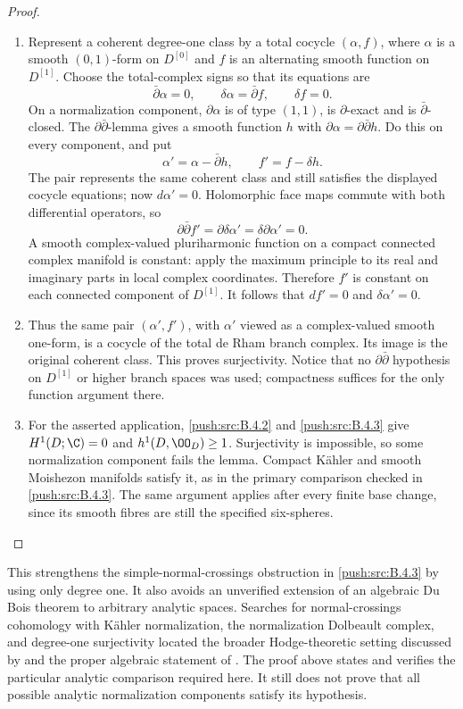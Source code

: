 \begin{proof}
\begin{enumerate}[label=\arabic*.,leftmargin=*]
\item Represent a coherent degree-one class by a total cocycle
$(\alpha,f)$, where $\alpha$ is a smooth $(0,1)$-form on
$D^{[0]}$ and $f$ is an alternating smooth function on
$D^{[1]}$. Choose the total-complex signs so that its equations
are
\[
 \bar\partial\alpha=0,\qquad
 \delta\alpha=\bar\partial f,\qquad \delta f=0.
\]
On a normalization component, $\partial\alpha$ is of type
$(1,1)$, is $\partial$-exact and is $\bar\partial$-closed.
The $\partial\bar\partial$-lemma gives a smooth function $h$
with $\partial\alpha=\partial\bar\partial h$.
Do this on every component, and put
\[
 \alpha'=\alpha-\bar\partial h,\qquad
 f'=f-\delta h.
\]
The pair represents the same coherent class and still satisfies
the displayed cocycle equations; now $d\alpha'=0$.
Holomorphic face maps commute with both differential operators,
so
\[
 \partial\bar\partial f'
       =\partial\delta\alpha'=\delta\partial\alpha'=0.
\]
A smooth complex-valued pluriharmonic function on a compact
connected complex manifold is constant: apply the maximum
principle to its real and imaginary parts in local complex
coordinates. Therefore $f'$ is constant on each connected
component of $D^{[1]}$. It follows that
$df'=0$ and $\delta\alpha'=0$.

\item Thus the same pair $(\alpha',f')$, with $\alpha'$ viewed as
a complex-valued smooth one-form, is a cocycle of the total
de Rham branch complex. Its image is the original coherent
class. This proves surjectivity. Notice that no
$\partial\bar\partial$ hypothesis on $D^{[1]}$ or higher
branch spaces was used; compactness suffices for the only
function argument there.

\item For the asserted application, \ref{push:src:B.4.2} and \ref{push:src:B.4.3} give
$H^1(D;\C)=0$ and $h^1(D,\OO_D)\geq1$.
Surjectivity is impossible, so some normalization component
fails the lemma. Compact K\"ahler and smooth Moishezon
manifolds satisfy it, as in the primary comparison checked
in \ref{push:src:B.4.3}. The same argument applies after every finite base
change, since its smooth fibres are still the specified
six-spheres.
\end{enumerate}
\end{proof}

This strengthens the simple-normal-crossings obstruction in
\ref{push:src:B.4.3} by using only degree one. It also avoids an unverified
extension of an algebraic Du Bois theorem to arbitrary analytic
spaces. Searches for normal-crossings cohomology with K\"ahler
normalization, the normalization Dolbeault complex, and
degree-one surjectivity located the broader Hodge-theoretic
setting discussed by \citet{Chen2026HodgeRoot} and the proper
algebraic statement of \citet{GrafKovacs2014Root}. The proof above
states and verifies the particular analytic comparison required
here. It still does not prove that all possible analytic
normalization components satisfy its hypothesis.

